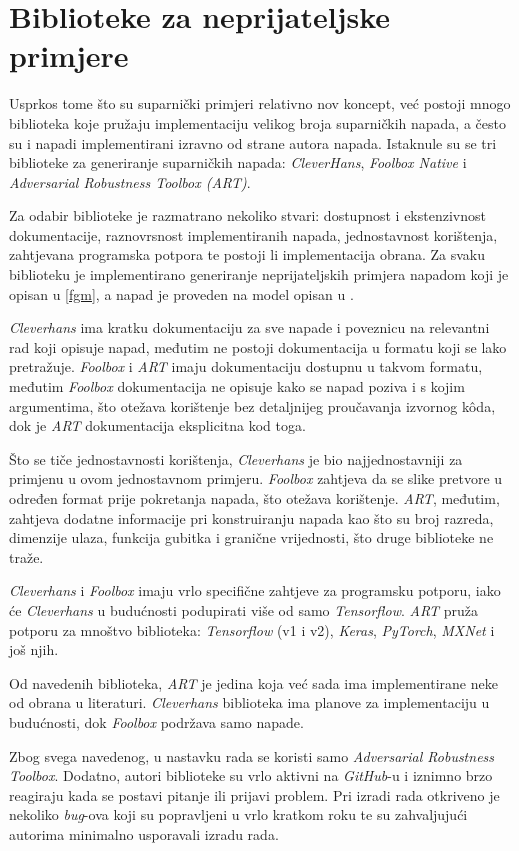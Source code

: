 \documentclass[utf8, diplomski]{fer}
\begin{document}
\section{Biblioteke za neprijateljske primjere}
Usprkos tome što su suparnički primjeri relativno nov koncept, već postoji mnogo biblioteka koje pružaju implementaciju velikog broja suparničkih napada, a često su i napadi implementirani izravno od strane autora napada. Istaknule su se tri biblioteke za generiranje suparničkih napada: \textit{CleverHans}\citep{papernot2018cleverhans}, \textit{Foolbox Native}\citep{rauber2017foolbox} i \textit{Adversarial Robustness Toolbox (ART)}\citep{art2018}.
\par
Za odabir biblioteke je razmatrano nekoliko stvari: dostupnost i ekstenzivnost dokumentacije, raznovrsnost implementiranih napada, jednostavnost korištenja, zahtjevana programska potpora te postoji li implementacija obrana. Za svaku biblioteku je implementirano generiranje neprijateljskih primjera napadom koji je opisan u \ref{fgm}, a napad je proveden na model opisan u .
\par
\textit{Cleverhans} ima kratku dokumentaciju za sve napade i poveznicu na relevantni rad koji opisuje napad, međutim ne postoji dokumentacija u formatu koji se lako pretražuje. \textit{Foolbox} i \textit{ART} imaju dokumentaciju dostupnu u takvom formatu, međutim \textit{Foolbox} dokumentacija ne opisuje kako se napad poziva i s kojim argumentima, što otežava korištenje bez detaljnijeg proučavanja izvornog kôda, dok je \textit{ART} dokumentacija eksplicitna kod toga.
\par
Što se tiče jednostavnosti korištenja, \textit{Cleverhans} je bio najjednostavniji za primjenu u ovom jednostavnom primjeru. \textit{Foolbox} zahtjeva da se slike pretvore u određen format prije pokretanja napada, što otežava korištenje. \textit{ART}, međutim, zahtjeva dodatne informacije pri konstruiranju napada kao što su broj razreda, dimenzije ulaza, funkcija gubitka i granične vrijednosti, što druge biblioteke ne traže.
\par
\textit{Cleverhans} i \textit{Foolbox} imaju vrlo specifične zahtjeve za programsku potporu, iako će \textit{Cleverhans} u budućnosti podupirati više od samo \textit{Tensorflow}. \textit{ART} pruža potporu za mnoštvo biblioteka: \textit{Tensorflow} (v1 i v2), \textit{Keras}, \textit{PyTorch}, \textit{MXNet} i još njih.
\par
Od navedenih biblioteka, \textit{ART} je jedina koja već sada ima implementirane neke od obrana u literaturi. \textit{Cleverhans} biblioteka ima planove za implementaciju u budućnosti, dok \textit{Foolbox} podržava samo napade.
\par
Zbog svega navedenog, u nastavku rada se koristi samo \textit{Adversarial Robustness Toolbox}. Dodatno, autori biblioteke su vrlo aktivni na \textit{GitHub}-u i iznimno brzo reagiraju kada se postavi pitanje ili prijavi problem. Pri izradi rada otkriveno je nekoliko \textit{bug}-ova koji su popravljeni u vrlo kratkom roku te su zahvaljujući autorima minimalno usporavali izradu rada.
\end{document}
